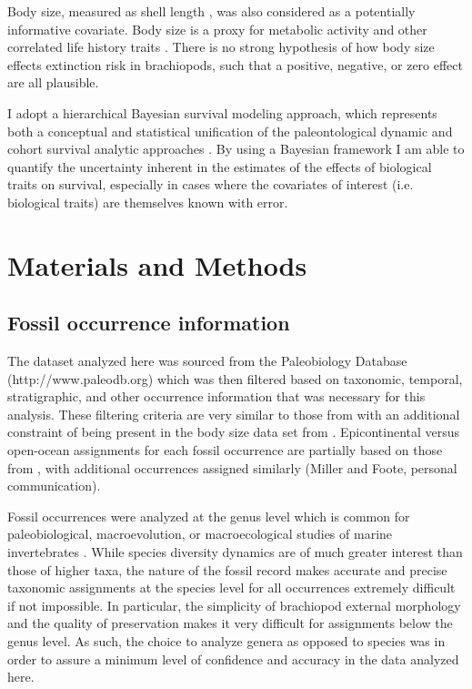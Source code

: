 \documentclass{article}
\begin{document}
Body size, measured as shell length \citep{Payne2014}, was also considered as a potentially informative covariate. Body size is a proxy for metabolic activity and other correlated life history traits \citep{Payne2014}. There is no strong hypothesis of how body size effects extinction risk in brachiopods, such that a positive, negative, or zero effect are all plausible. 

I adopt a hierarchical Bayesian survival modeling approach, which represents both a conceptual and statistical unification of the paleontological dynamic and cohort survival analytic approaches \citep{VanValen1973,VanValen1979,Raup1978,Raup1975,Foote1988,Baumiller1993,Simpson2006}. By using a Bayesian framework I am able to quantify the uncertainty inherent in the estimates of the effects of biological traits on survival, especially in cases where the covariates of interest (i.e. biological traits) are themselves known with error. 


\section{Materials and Methods}

\subsection{Fossil occurrence information}

The dataset analyzed here was sourced from the Paleobiology Database (http://www.paleodb.org) which was then filtered based on taxonomic, temporal, stratigraphic, and other occurrence information that was necessary for this analysis. These filtering criteria are very similar to those from \citet{Foote2013} with an additional constraint of being present in the body size data set from \citet{Payne2014}. Epicontinental versus open-ocean assignments for each fossil occurrence are partially based on those from \citet{Miller2009a}, with additional occurrences assigned similarly (Miller and Foote, personal communication).

Fossil occurrences were analyzed at the genus level which is common for paleobiological, macroevolution, or macroecological studies of marine invertebrates \citep{Alroy2010,Foote2013,Harnik2013,Kiessling2007a,Miller2009a,Nurnberg2013a,Nurnberg2015,Payne2007,Simpson2009,Vilhena2013}. While species diversity dynamics are of much greater interest than those of higher taxa, the nature of the fossil record makes accurate and precise taxonomic assignments at the species level for all occurrences extremely difficult if not impossible. In particular, the simplicity of brachiopod external morphology and the quality of preservation makes it very difficult for assignments below the genus level. As such, the choice to analyze genera as opposed to species was in order to assure a minimum level of confidence and accuracy in the data analyzed here.
\end{document}
